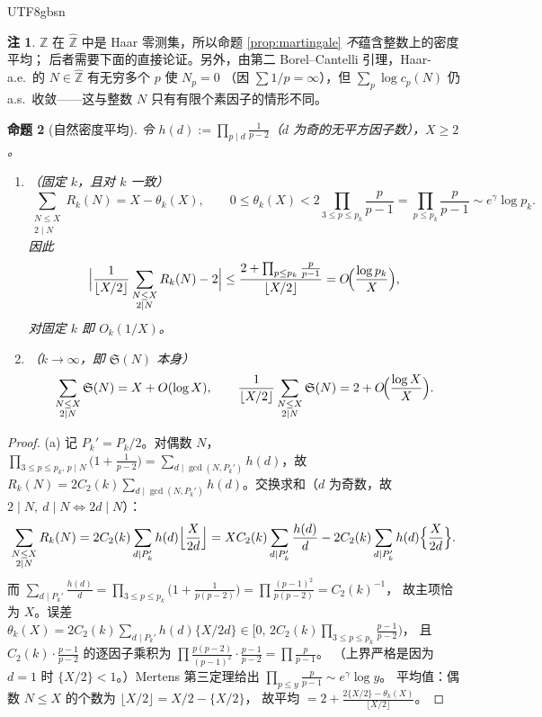 \documentclass[11pt,a4paper]{article}
\newcommand{\Zhat}{\widehat{\mathbb Z}}
\newcommand{\Sing}{\mathfrak S}
\newcommand{\status}[1]{\par\noindent\fbox{\textbf{状态：#1}}\par\smallskip}
\theoremstyle{plain}
\newtheorem{prop}{命题}[section]
\theoremstyle{definition}
\newtheorem{rem}[prop]{注}
\begin{document}
\begin{CJK}{UTF8}{gbsn}
\begin{rem}
$\mathbb Z$ 在 $\Zhat$ 中是 Haar 零测集，所以命题 \ref{prop:martingale} \emph{不}蕴含整数上的密度平均；
后者需要下面的直接论证。另外，由第二 Borel--Cantelli 引理，Haar-a.e.\ 的 $N\in\Zhat$ 有无穷多个 $p$ 使 $N_p=0$
（因 $\sum1/p=\infty$），但 $\sum_p\log c_p(N)$ 仍 a.s.\ 收敛——这与整数 $N$ 只有有限个素因子的情形不同。
\end{rem}

\begin{prop}[自然密度平均]\label{prop:density}
令 $h(d):=\prod_{p\mid d}\frac1{p-2}$（$d$ 为奇的无平方因子数），$X\ge2$。
\begin{enumerate}[label=(\alph*)]
\item（固定 $k$，且对 $k$ 一致）
\[
\sum_{\substack{N\le X\\ 2\mid N}}R_k(N)=X-\theta_k(X),\qquad
0\le\theta_k(X)<2\prod_{3\le p\le p_k}\frac{p}{p-1}=\prod_{p\le p_k}\frac p{p-1}\sim e^{\gamma}\log p_k .
\]
因此
\[
\Bigl|\frac1{\lfloor X/2\rfloor}\sum_{\substack{N\le X\\2\mid N}}R_k(N)-2\Bigr|
\le\frac{2+\prod_{p\le p_k}\frac p{p-1}}{\lfloor X/2\rfloor}=O\!\Bigl(\frac{\log p_k}{X}\Bigr),
\]
对固定 $k$ 即 $O_k(1/X)$。
\item（$k\to\infty$，即 $\Sing(N)$ 本身）
\[
\sum_{\substack{N\le X\\2\mid N}}\Sing(N)=X+O(\log X),\qquad
\frac1{\lfloor X/2\rfloor}\sum_{\substack{N\le X\\2\mid N}}\Sing(N)=2+O\!\Bigl(\frac{\log X}{X}\Bigr).
\]
\end{enumerate}
\end{prop}
\status{已证}
\begin{proof}
(a) 记 $P_k'=P_k/2$。对偶数 $N$，
$\prod_{3\le p\le p_k,\,p\mid N}\bigl(1+\frac1{p-2}\bigr)=\sum_{d\mid\gcd(N,P_k')}h(d)$，故
$R_k(N)=2C_2(k)\sum_{d\mid\gcd(N,P_k')}h(d)$。交换求和（$d$ 为奇数，故 $2\mid N,\ d\mid N\iff 2d\mid N$）：
\[
\sum_{\substack{N\le X\\2\mid N}}R_k(N)=2C_2(k)\sum_{d\mid P_k'}h(d)\Bigl\lfloor\frac X{2d}\Bigr\rfloor
=XC_2(k)\sum_{d\mid P_k'}\frac{h(d)}d-2C_2(k)\sum_{d\mid P_k'}h(d)\Bigl\{\frac X{2d}\Bigr\}.
\]
而 $\sum_{d\mid P_k'}\frac{h(d)}d=\prod_{3\le p\le p_k}\bigl(1+\frac1{p(p-2)}\bigr)=\prod\frac{(p-1)^2}{p(p-2)}=C_2(k)^{-1}$，
故主项恰为 $X$。误差
$\theta_k(X)=2C_2(k)\sum_{d\mid P_k'}h(d)\{X/2d\}\in\bigl[0,\,2C_2(k)\prod_{3\le p\le p_k}\frac{p-1}{p-2}\bigr)$，
且 $C_2(k)\cdot\frac{p-1}{p-2}$ 的逐因子乘积为 $\prod\frac{p(p-2)}{(p-1)^2}\cdot\frac{p-1}{p-2}=\prod\frac p{p-1}$。
（上界严格是因为 $d=1$ 时 $\{X/2\}<1$。）Mertens 第三定理给出 $\prod_{p\le y}\frac p{p-1}\sim e^\gamma\log y$。
平均值：偶数 $N\le X$ 的个数为 $\lfloor X/2\rfloor=X/2-\{X/2\}$，
故平均 $=2+\frac{2\{X/2\}-\theta_k(X)}{\lfloor X/2\rfloor}$。


\end{proof}
\end{CJK}
\end{document}
